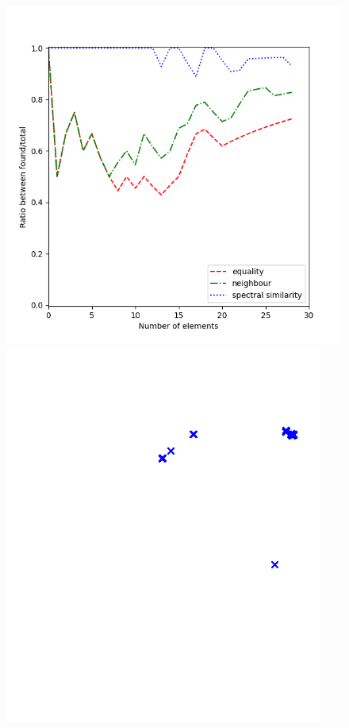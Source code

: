 \begin{figure}[H]
\centering
  \centering
  \includegraphics[width=\linewidth-1.5in]{figures/wtc.png}
\begin{minipage}{.35\textwidth}
  \centering
  \includegraphics[width=\linewidth, frame]{figures/wtc_ref.png}

\end{minipage}
\end{figure}
